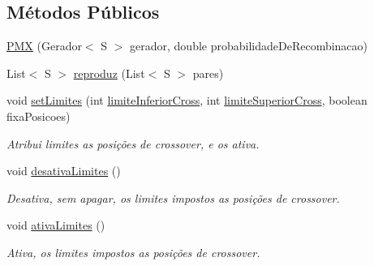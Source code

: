 \subsection*{Métodos Públicos}
\begin{DoxyCompactItemize}
\item 
\hyperlink{classic_1_1populacional_1_1algoritmo_1_1operadores_1_1recombinador_1_1_p_m_x_3_01_s_01extends_01_ser_01_4_ac4fad24a78c23a67d7073e52039c4424}{P\-M\-X} (Gerador$<$ S $>$ gerador, double probabilidade\-De\-Recombinacao)
\item 
List$<$ S $>$ \hyperlink{classic_1_1populacional_1_1algoritmo_1_1operadores_1_1recombinador_1_1_p_m_x_3_01_s_01extends_01_ser_01_4_a485bfc7d2615c87f8fbff6ae15092b89}{reproduz} (List$<$ S $>$ pares)
\item 
void \hyperlink{classic_1_1populacional_1_1algoritmo_1_1operadores_1_1recombinador_1_1_p_m_x_3_01_s_01extends_01_ser_01_4_aa8d1dcb410f1d9d49e4ab44b54f81c30}{set\-Limites} (int \hyperlink{classic_1_1populacional_1_1algoritmo_1_1operadores_1_1recombinador_1_1_p_m_x_3_01_s_01extends_01_ser_01_4_afa30d091104d7e520e3d1612a8453ee0}{limite\-Inferior\-Cross}, int \hyperlink{classic_1_1populacional_1_1algoritmo_1_1operadores_1_1recombinador_1_1_p_m_x_3_01_s_01extends_01_ser_01_4_ab3e6575836e6b19fa425076b30e90d70}{limite\-Superior\-Cross}, boolean fixa\-Posicoes)
\begin{DoxyCompactList}\small\item\em Atribui limites as posições de crossover, e os ativa. \end{DoxyCompactList}\item 
void \hyperlink{classic_1_1populacional_1_1algoritmo_1_1operadores_1_1recombinador_1_1_p_m_x_3_01_s_01extends_01_ser_01_4_a935e288b2dc08ad06437e92b96fcc0c9}{desativa\-Limites} ()
\begin{DoxyCompactList}\small\item\em Desativa, sem apagar, os limites impostos as posições de crossover. \end{DoxyCompactList}\item 
void \hyperlink{classic_1_1populacional_1_1algoritmo_1_1operadores_1_1recombinador_1_1_p_m_x_3_01_s_01extends_01_ser_01_4_a39c7f88521329ccd555468400d25d8b5}{ativa\-Limites} ()
\begin{DoxyCompactList}\small\item\em Ativa, os limites impostos as posições de crossover. \end{DoxyCompactList}\end{DoxyCompactItemize}
